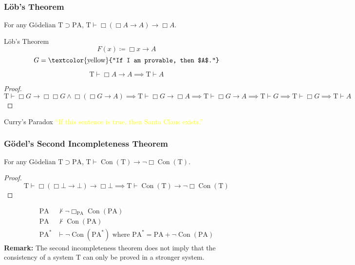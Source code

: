 \documentclass[UTF8,11pt,colorlinks,compress,openany]{beamer}%
\begin{document}
\begin{frame}\frametitle{L\"ob's Theorem}
\setlength\abovedisplayskip{0pt}
\setlength\belowdisplayskip{0pt}
	\begin{theorem}[L\"ob's Theorem]
		For any G\"odelian $\mathrm{T}\supset \mathrm{PA} $, $\mathrm{T}\vdash\Box (\Box A\to A)\to\Box A$.
	\end{theorem}
	\begin{block}{L\"ob's Theorem}
		\[F(x)\coloneqq \Box x\to A\]
		\[G=\text{\textcolor{yellow}{``If I am provable, then $A$.''}}\]
	\end{block}
	\begin{corollary}
		\[\mathrm{T}\vdash\Box A\to A\implies \mathrm{T}\vdash A\]
	\end{corollary}\vspace{-1ex}
	\begin{proof}
	$\mathrm{T}\vdash\Box G\to \Box \Box G\wedge\Box (\Box G\to A)\implies\mathrm{T}\vdash\Box G\to\Box A\implies \mathrm{T}\vdash\Box G\to A\implies\mathrm{T}\vdash G\implies\mathrm{T}\vdash\Box G\implies\mathrm{T}\vdash A$
	\end{proof}\vspace{-1ex}
	\begin{block}{Curry's Paradox}
		\centering \textcolor{yellow}{``If this sentence is true, then Santa Claus exists.''}
	\end{block}
\end{frame}

\begin{frame}\frametitle{G\"odel's Second Incompleteness Theorem}
\setlength\abovedisplayskip{0pt}
\setlength\belowdisplayskip{0pt}
	\begin{theorem}
		For any G\"odelian $\mathrm{T}\supset \mathrm{PA} $, $\mathrm{T}\vdash\operatorname{Con}(\mathrm{T})\to\neg\Box \operatorname{Con}(\mathrm{T})$.
	\end{theorem}
	\begin{proof}
		\[\mathrm{T}\vdash\Box (\Box \bot\to\bot)\to\Box \bot\implies\mathrm{T}\vdash\operatorname{Con}(\mathrm{T})\to\neg\Box \operatorname{Con}(\mathrm{T})\]
	\end{proof}
	\begin{align*}
		\mathrm{PA}&\nvdash\neg\Box_{\mathrm{PA}}\operatorname{Con}(\mathrm{PA})\\
		\mathrm{PA}&\nvdash\operatorname{Con}(\mathrm{PA})\\
		\mathrm{PA}^*&\vdash\neg\operatorname{Con}(\mathrm{PA}^*) \mbox{ where } \mathrm{PA}^*=\mathrm{PA}+\neg\operatorname{Con}(\mathrm{PA})
	\end{align*}
	\textbf{Remark:} The second incompleteness theorem does not imply that the consistency of a system $\mathrm{T}$ can only be proved in a stronger system.
\end{frame}
\end{document}
